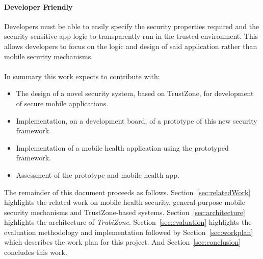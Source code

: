 \paragraph*{\textbf{Developer Friendly\\}} Developers must be able to easily specify the security properties required and the security-sensitive app logic to transparently run in the trusted environment. This allows developers to focus on the logic and design of said application rather than mobile security mechanisms.\\\\
%
%
%
In summary this work expects to contribute with:
\begin{itemize}
	\item The design of a novel security system, based on TrustZone, for development of secure mobile applications.
	\item Implementation, on a development board, of a prototype of this new security framework.
	\item Implementation of a mobile health application using the prototyped framework.
	\item Assessment of the prototype and mobile health app.
\end{itemize}

%
The remainder of this document proceeds as follows. Section~\ref{sec:relatedWork} highlights the related work on mobile health security, general-purpose mobile security mechanisms and TrustZone-based systems. Section~\ref{sec:architecture} highlights the architecture of \emph{TrubiZone}. Section~\ref{sec:evaluation} highlights the evaluation methodology and implementation followed by Section~\ref{sec:workplan} which describes the work plan for this project. And Section~\ref{sec:conclusion} concludes this work.
